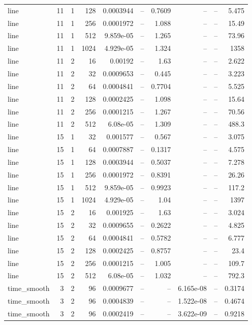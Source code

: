 \begin{tabular}{lrrrrrrrrr}
line & 11 & 1 & 128 & 0.0003944 & -- & 0.7609 & -- & -- & 5.475 \\
line & 11 & 1 & 256 & 0.0001972 & -- & 1.088 & -- & -- & 15.49 \\
line & 11 & 1 & 512 & 9.859e-05 & -- & 1.265 & -- & -- & 73.96 \\
line & 11 & 1 & 1024 & 4.929e-05 & -- & 1.324 & -- & -- & 1358 \\
line & 11 & 2 & 16 & 0.00192 & -- & 1.63 & -- & -- & 2.622 \\
line & 11 & 2 & 32 & 0.0009653 & -- & 0.445 & -- & -- & 3.223 \\
line & 11 & 2 & 64 & 0.0004841 & -- & 0.7704 & -- & -- & 5.525 \\
line & 11 & 2 & 128 & 0.0002425 & -- & 1.098 & -- & -- & 15.64 \\
line & 11 & 2 & 256 & 0.0001215 & -- & 1.267 & -- & -- & 70.56 \\
line & 11 & 2 & 512 & 6.08e-05 & -- & 1.309 & -- & -- & 488.3 \\
line & 15 & 1 & 32 & 0.001577 & -- & 0.567 & -- & -- & 3.075 \\
line & 15 & 1 & 64 & 0.0007887 & -- & 0.1317 & -- & -- & 4.575 \\
line & 15 & 1 & 128 & 0.0003944 & -- & 0.5037 & -- & -- & 7.278 \\
line & 15 & 1 & 256 & 0.0001972 & -- & 0.8391 & -- & -- & 26.26 \\
line & 15 & 1 & 512 & 9.859e-05 & -- & 0.9923 & -- & -- & 117.2 \\
line & 15 & 1 & 1024 & 4.929e-05 & -- & 1.04 & -- & -- & 1397 \\
line & 15 & 2 & 16 & 0.001925 & -- & 1.63 & -- & -- & 3.024 \\
line & 15 & 2 & 32 & 0.0009655 & -- & 0.2622 & -- & -- & 4.825 \\
line & 15 & 2 & 64 & 0.0004841 & -- & 0.5782 & -- & -- & 6.777 \\
line & 15 & 2 & 128 & 0.0002425 & -- & 0.8757 & -- & -- & 23.4 \\
line & 15 & 2 & 256 & 0.0001215 & -- & 1.005 & -- & -- & 109.7 \\
line & 15 & 2 & 512 & 6.08e-05 & -- & 1.032 & -- & -- & 792.3 \\
time\_smooth & 3 & 2 & 96 & 0.0009677 & -- & -- & 6.165e-08 & -- & 0.3174 \\
time\_smooth & 3 & 2 & 96 & 0.0004839 & -- & -- & 1.522e-08 & -- & 0.4674 \\
time\_smooth & 3 & 2 & 96 & 0.0002419 & -- & -- & 3.622e-09 & -- & 0.9218 \\

\end{tabular}
